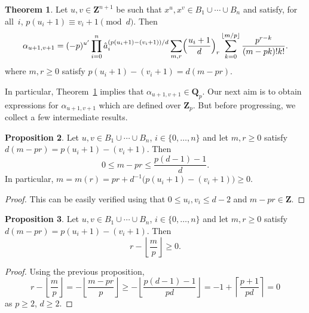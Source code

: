\documentclass[a4paper,11pt]{article}
\numberwithin{equation}{section}
\providecommand{\floor}[1]{\left\lfloor#1\right\rfloor}   %
\providecommand{\ceil}[1]{\left\lceil#1\right\rceil}   %
\newcommand{\ZZ}{\mathbf{Z}} %
\newcommand{\QQ}{\mathbf{Q}} %
\theoremstyle{definition}
\newtheorem{thm}{Theorem}[section]
\newtheorem{prop}[thm]{Proposition}
\begin{document}
\begin{thm} \label{thm:alpha}
Let $u, v \in \ZZ^{n+1}$ be such that 
$x^u, x^v \in B_1 \cup \dotsb \cup B_n$ and satisfy, 
for all~$i$, $p (u_i + 1) \equiv v_i + 1 \pmod{d}$. 
Then 
\begin{equation}
\alpha_{u+1,v+1} = (-p)^{u'} \prod_{i=0}^n 
    \hat{a}_i^{(p (u_i + 1) - (v_i + 1))/d} \sum_{m,r} 
    \Bigl(\frac{u_i+1}{d}\Bigr)_r 
    \sum_{k=0}^{\floor{m/p}} \frac{p^{r-k}}{(m-pk)! k!}.
\end{equation}
where $m, r \geq 0$ satisfy $p (u_i + 1) - (v_i + 1) = d (m - pr)$.
\hfill \qedsymbol
\end{thm}

In particular, Theorem~\ref{thm:alpha} implies that 
$\alpha_{u+1, v+1} \in \QQ_p$.  Our next aim is to obtain 
expressions for $\alpha_{u+1,v+1}$ which are defined over 
$\ZZ_p$.  But before progressing, we collect a few 
intermediate results.

\begin{prop} \label{prop:mpr1}
Let $u, v \in B_1 \cup \dotsb \cup B_n$, $i \in \{0,\dotsc,n\}$ and 
let $m, r \geq 0$ satisfy $d(m-pr) = p(u_i + 1) - (v_i + 1)$.  Then 
\begin{equation*}
0 \leq m - p r \leq \frac{p(d-1)-1}{d}.
\end{equation*}
In particular, $m = m(r) = pr + d^{-1}\bigl(p(u_i+1)-(v_i+1)\bigr) \geq 0$.
\end{prop}

\begin{proof}
This can be easily verified using that $0 \leq u_i, v_i \leq d - 2$ 
and $m - pr \in \ZZ$.
\end{proof}

\begin{prop} \label{prop:mpr2}
Let $u, v \in B_1 \cup \dotsb \cup B_n$, $i \in \{0,\dotsc,n\}$ and 
let $m, r \geq 0$ satisfy $d(m-pr) = p(u_i + 1) - (v_i + 1)$.  Then 
\begin{equation*}
r - \floor{\frac{m}{p}} \geq 0.
\end{equation*}
\end{prop}

\begin{proof}
Using the previous proposition,
\begin{equation*}
r - \floor{\frac{m}{p}} 
= - \floor{\frac{m-pr}{p}} 
\geq - \floor{\frac{p(d-1)-1}{pd}} 
= -1 + \ceil{\frac{p + 1}{pd}} 
= 0 
\end{equation*}
as $p \geq 2$, $d \geq 2$.
\end{proof}
\end{document}
